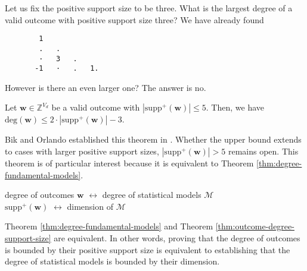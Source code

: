 \begin{example}
    Let us fix the positive support size to be three. What is the largest degree of a valid outcome with positive support size three? We have already found
    \begin{verbatim}
        1  
        .   .     
        ·   3   .    
       -1   ·   .   1.   
    \end{verbatim} 
    However is there an even larger one? The answer is no.
 \end{example}

\begin{theorem}\label{thm:outcome-degree-support-size}
    Let \( \mathbf w \in \mathbb{Z}^{V_d} \) be a valid outcome with \( |\mathrm{supp}^+(\mathbf w)| \leq 5 \). Then, we have \( \mathrm{deg}(\mathbf w) \leq 2 \cdot |\mathrm{supp}^+(\mathbf w)| - 3 \).
\end{theorem}

Bik and Orlando established this theorem in \cite{bik2022classifying}. Whether the upper bound extends to cases with larger positive support sizes, \( |\mathrm{supp}^+(\mathbf w)| > 5 \) remains open. This theorem is of particular interest because it is equivalent to Theorem \ref{thm:degree-fundamental-models}.

\begin{center}
    degree of outcomes \( \mathbf{w} \) \( \longleftrightarrow \) degree of statistical models \( \mathcal{M} \) \\
    \( \mathrm{supp}^+(\mathbf w) \) \( \longleftrightarrow \) dimension of \( \mathcal{M} \)
\end{center}

\begin{proposition}\label{prop:equivalence-degree-support-size}
    Theorem \ref{thm:degree-fundamental-models} and Theorem \ref{thm:outcome-degree-support-size} are equivalent. In other words, proving that the degree of outcomes is bounded by their positive support size is equivalent to establishing that the degree of statistical models is bounded by their dimension.
\end{proposition}


